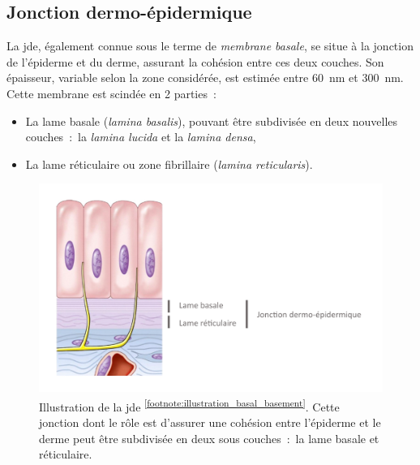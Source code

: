 \subsection{Jonction dermo-épidermique}
La \gls{jde}, également connue sous le terme de \textit{membrane basale}, se situe à la jonction de l’épiderme et du derme, assurant la cohésion entre ces deux couches. Son épaisseur, variable selon la zone considérée, est estimée entre \SI{60}{\nano\metre} et \SI{300}{\nano\metre}. 
Cette membrane est scindée en 2 parties~:
\begin{itemize}
\item La lame basale (\textit{lamina basalis}), pouvant être subdivisée en deux nouvelles couches~:~la \textit{lamina lucida} et la \textit{lamina densa},
\item La lame réticulaire ou zone fibrillaire (\textit{lamina reticularis}).
\end{itemize}\par
\begin{figure}[H]
    \centering
    \includegraphics[width=\linewidth]{contents/chapter_1/resources/illustration_basal_basement.pdf}
    \caption{Illustration de la \acrlong{jde} \textsuperscript{\ref{footnote:illustration_basal_basement}}. Cette jonction dont le rôle est d'assurer une cohésion entre l'épiderme et le derme peut être subdivisée en deux sous couches~:~la lame basale et réticulaire.}
    \label{fig:illustration_basal_basement}
\end{figure}\par

\addtocounter{footnote}{1}

